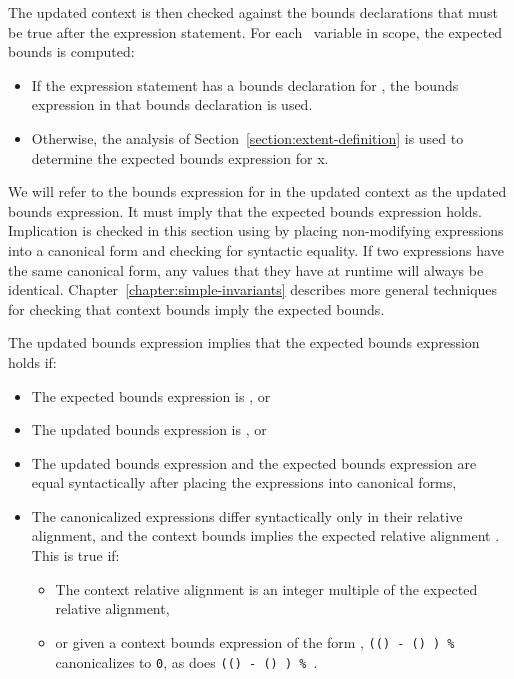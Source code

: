The updated context is then checked against the bounds declarations that
must be true after the expression statement. For each
\arrayptr\ variable  in scope, the expected bounds is
computed:

\begin{itemize}
\item
  If the expression statement has a bounds declaration for , the
  bounds expression in that bounds declaration is used.
\item
  Otherwise, the analysis of Section~\ref{section:extent-definition}
  is used to determine the
  expected bounds expression for x.
\end{itemize}

We will refer to the bounds expression for  in the updated context
as the updated bounds expression.  It must imply that the
expected bounds expression holds. Implication is checked in this section
using by placing non-modifying expressions into a canonical form and
checking for syntactic equality. If two expressions have the same
canonical form, any values that they have at runtime will always be
identical. Chapter~\ref{chapter:simple-invariants}
describes more general techniques for checking
that context bounds imply the expected bounds.

The updated bounds expression implies that the expected bounds
expression holds if:

\begin{itemize}
\item
  The expected bounds expression is \boundsnone, or
\item
  The updated bounds expression is \boundsany, or
\item
  The updated bounds expression and the expected bounds expression are
  equal syntactically after placing the expressions into canonical
  forms,
\item
  The canonicalized expressions
  differ syntactically only in their relative alignment, and
  the context bounds implies the expected relative alignment .
  This is true if:

  \begin{itemize}
  \item
    The context relative alignment is an integer multiple of the
    expected relative alignment,
  \item
   or given a context bounds expression of the form
   ,
   \texttt{((\arrayptrchar)  - (\arrayptrchar) ) \% }
   canonicalizes to \texttt{0}, as does
   \texttt{((\arrayptrchar)  - (\arrayptrchar) ) \% }.
  \end{itemize}
\end{itemize}

